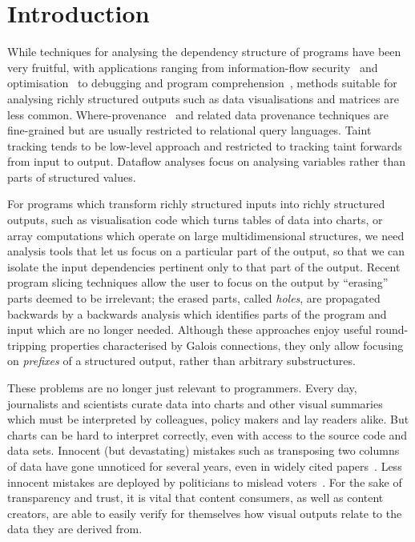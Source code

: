 \section{Introduction}

While techniques for analysing the dependency structure of programs have been very fruitful, with applications ranging from information-flow security~\cite{sabelfeld03} and optimisation~\cite{kildall73} to debugging and program comprehension~\cite{weiser81,delucia96}, methods suitable for analysing richly structured outputs such as data visualisations and matrices are less common. Where-provenance~\cite{buneman01} and related data provenance techniques are fine-grained but are usually restricted to relational query languages. Taint tracking \cite{newsome05} tends to be low-level approach and restricted to tracking taint forwards from input to output. Dataflow analyses \cite{reps95} focus on analysing variables rather than parts of structured values.

For programs which transform richly structured inputs into richly structured outputs, such as visualisation code which turns tables of data into charts, or array computations which operate on large multidimensional structures, we need analysis tools that let us focus on a particular part of the output, so that we can isolate the input dependencies pertinent only to that part of the output. Recent program slicing techniques \cite{perera12a,perera13a,ricciotti17} allow the user to focus on the output by ``erasing'' parts deemed to be irrelevant; the erased parts, called \emph{holes}, are propagated backwards by a backwards analysis which identifies parts of the program and input which are no longer needed. Although these approaches enjoy useful round-tripping properties characterised by Galois connections, they only allow focusing on \emph{prefixes} of a structured output, rather than arbitrary substructures.

These problems are no longer just relevant to programmers. Every day, journalists and scientists curate data into charts and other visual summaries which must be interpreted by colleagues, policy makers and lay readers alike. But charts can be hard to interpret correctly, even with access to the source code and data sets. Innocent (but devastating) mistakes such as transposing two columns of data have gone unnoticed for several years, even in widely cited papers~\cite{miller06}. Less innocent mistakes are deployed by politicians to mislead voters~\cite{fullfact19}. For the sake of transparency and trust, it is vital that content consumers, as well as content creators, are able to easily verify for themselves how visual outputs relate to the data they are derived from.

